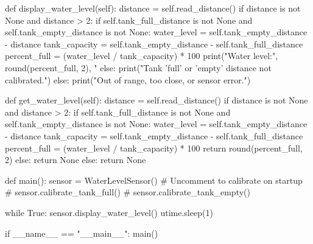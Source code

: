 \documentclass[12pt]{article} %
\begin{document}
\begin{pythoncode}[caption={Pico W Ultrasonic Sensor Code}]
        def display_water_level(self):
            distance = self.read_distance()
            if distance is not None and distance > 2:
                if self.tank_full_distance is not None and self.tank_empty_distance is not None:
                    water_level = self.tank_empty_distance - distance
                    tank_capacity = self.tank_empty_distance - self.tank_full_distance
                    percent_full = (water_level / tank_capacity) * 100
                    print("Water level:", round(percent_full, 2), "%
                else:
                    print("Tank 'full' or 'empty' distance not calibrated.")
            else:
                print("Out of range, too close, or sensor error.")
    
        def get_water_level(self):
            distance = self.read_distance()
            if distance is not None and distance > 2:
                if self.tank_full_distance is not None and self.tank_empty_distance is not None:
                    water_level = self.tank_empty_distance - distance
                    tank_capacity = self.tank_empty_distance - self.tank_full_distance
                    percent_full = (water_level / tank_capacity) * 100
                    return round(percent_full, 2)
                else:
                    return None
            else:
                return None
    
    def main():
        sensor = WaterLevelSensor()
        # Uncomment to calibrate on startup
        # sensor.calibrate_tank_full()
        # sensor.calibrate_tank_empty()
    
        while True:
            sensor.display_water_level()
            utime.sleep(1)
    
    if __name__ == "__main__":
        main()
    
    
\end{pythoncode}
\end{document}
